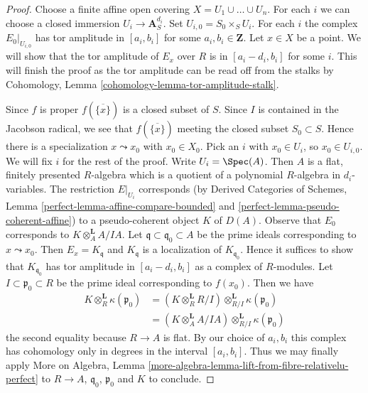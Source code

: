 \begin{proof}
Choose a finite affine open covering $X = U_1 \cup \ldots \cup U_n$.
For each $i$ we can choose a closed immersion $U_i \to \mathbf{A}^{d_i}_S$.
Set $U_{i, 0} = S_0 \times_S U_i$.
For each $i$ the complex $E_0|_{U_{i, 0}}$ has tor amplitude
in $[a_i, b_i]$ for some $a_i, b_i \in \mathbf{Z}$.
Let $x \in X$ be a point.
We will show that the tor amplitude of
$E_x$ over $R$ is in $[a_i - d_i, b_i]$ for some $i$.
This will finish the proof as the tor amplitude can be
read off from the stalks by
Cohomology, Lemma \ref{cohomology-lemma-tor-amplitude-stalk}.

\medskip\noindent
Since $f$ is proper $f(\overline{\{x\}})$ is a closed subset of $S$.
Since $I$ is contained in the Jacobson radical, we see that
$f(\overline{\{x\}})$ meeting the closed subset $S_0 \subset S$.
Hence there is a specialization $x \leadsto x_0$ with $x_0 \in X_0$.
Pick an $i$ with $x_0 \in U_i$, so $x_0 \in U_{i, 0}$.
We will fix $i$ for the rest of the proof.
Write $U_i = \Spec(A)$. Then $A$ is a flat, finitely presented
$R$-algebra which is a quotient of a polynomial $R$-algebra in
$d_i$-variables. The restriction $E|_{U_i}$ corresponds
(by Derived Categories of Schemes, Lemma
\ref{perfect-lemma-affine-compare-bounded} and
\ref{perfect-lemma-pseudo-coherent-affine})
to a pseudo-coherent object $K$ of $D(A)$.
Observe that $E_0$ corresponds to $K \otimes_A^\mathbf{L} A/IA$.
Let $\mathfrak q \subset \mathfrak q_0 \subset A$ be the prime
ideals corresponding to $x \leadsto x_0$.
Then $E_x = K_{\mathfrak q}$ and $K_{\mathfrak q}$
is a localization of $K_{\mathfrak q_0}$. Hence it suffices
to show that $K_{\mathfrak q_0}$ has tor amplitude in
$[a_i - d_i, b_i]$ as a complex of $R$-modules.
Let $I \subset \mathfrak p_0 \subset R$ be the prime
ideal corresponding to $f(x_0)$.
Then we have
\begin{align*}
K \otimes_R^\mathbf{L} \kappa(\mathfrak p_0)
& =
(K \otimes_R^\mathbf{L} R/I) \otimes_{R/I}^\mathbf{L}
\kappa(\mathfrak p_0) \\
& =
(K \otimes_A^\mathbf{L} A/IA) \otimes_{R/I}^\mathbf{L} \kappa(\mathfrak p_0)
\end{align*}
the second equality because $R \to A$ is flat.
By our choice of $a_i, b_i$ this complex has cohomology
only in degrees in the interval $[a_i, b_i]$.
Thus we may finally apply
More on Algebra, Lemma
\ref{more-algebra-lemma-lift-from-fibre-relativelu-perfect}
to $R \to A$, $\mathfrak q_0$, $\mathfrak p_0$ and $K$
to conclude.
\end{proof}














